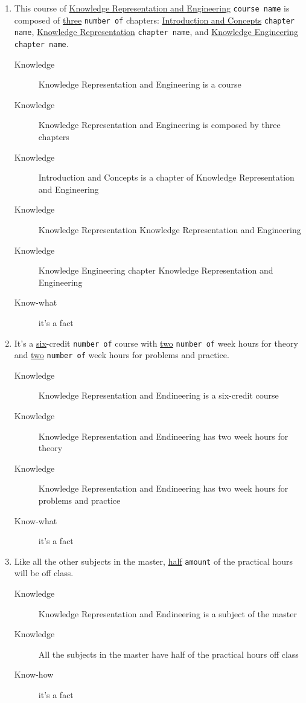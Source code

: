 \documentclass[a4paper,10pt,twoside,twocolumn]{article}
\begin{document}
\begin{enumerate}
\item This course of \uline{Knowledge Representation and Engineering} \texttt{course name} is composed of \uline{three} \texttt{number of} chapters:  \uline{Introduction  and  Concepts} \texttt{chapter name}, \uline{Knowledge  Representation} \texttt{chapter name}, and \uline{Knowledge Engineering} \texttt{chapter name}.
\begin{description}
\item[{Knowledge}] Knowledge Representation and Engineering is a course
\item[{Knowledge}] Knowledge Representation and Engineering is composed by three chapters
\item[{Knowledge}] Introduction and Concepts is a chapter of Knowledge Representation and Engineering
\item[{Knowledge}] Knowledge Representation Knowledge Representation and Engineering
\item[{Knowledge}] Knowledge Engineering chapter Knowledge Representation and Engineering
\item[{Know-what}] it's a fact
\end{description}
\item It’s a \uline{six}-credit \texttt{number of} course with \uline{two} \texttt{number of} week hours for theory and \uline{two} \texttt{number of} week hours for problems and practice.
\begin{description}
\item[{Knowledge}] Knowledge Representation and Endineering is a six-credit course
\item[{Knowledge}] Knowledge Representation and Endineering has two week hours for theory
\item[{Knowledge}] Knowledge Representation and Endineering has two week hours for problems and practice
\item[{Know-what}] it's a fact
\end{description}
\item Like all the other subjects in the master, \uline{half} \texttt{amount} of the practical hours will be off class.
\begin{description}
\item[{Knowledge}] Knowledge Representation and Endineering is a subject of the master
\item[{Knowledge}] All the subjects in the master have half of the practical hours off class
\item[{Know-how}] it's a fact

\end{description}
\end{enumerate}
\end{document}
